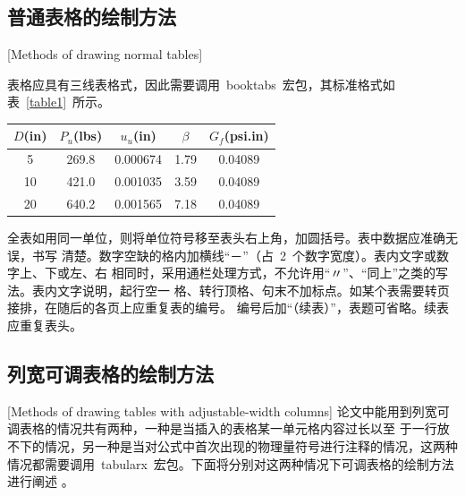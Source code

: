 \subsection{普通表格的绘制方法}[Methods of drawing normal tables]

表格应具有三线表格式，因此需要调用~booktabs~宏包，其标准格式如表~\ref{table1}~所示。
\begin{table}[htbp]
  \vspace{0.5em}\centering\wuhao
  \begin{tabular}{ccccc}
    \toprule[1.5pt]
    $D$(in) & $P_u$(lbs) & $u_u$(in) & $\beta$ & $G_f$(psi.in) \\
    \midrule[1pt]
    5       & 269.8      & 0.000674  & 1.79    & 0.04089       \\
    10      & 421.0      & 0.001035  & 3.59    & 0.04089       \\
    20      & 640.2      & 0.001565  & 7.18    & 0.04089       \\
    \bottomrule[1.5pt]
  \end{tabular}
\end{table}
全表如用同一单位，则将单位符号移至表头右上角，加圆括号。表中数据应准确无误，书写
清楚。数字空缺的格内加横线“－”（占~2~个数字宽度）。表内文字或数字上、下或左、右
相同时，采用通栏处理方式，不允许用“〃”、“同上”之类的写法。表内文字说明，起行空一
格、转行顶格、句末不加标点。如某个表需要转页接排，在随后的各页上应重复表的编号。
编号后加“（续表）”，表题可省略。续表应重复表头。

\subsection{列宽可调表格的绘制方法}[Methods of drawing tables with adjustable-width columns]
论文中能用到列宽可调表格的情况共有两种，一种是当插入的表格某一单元格内容过长以至
于一行放不下的情况，另一种是当对公式中首次出现的物理量符号进行注释的情况，这两种
情况都需要调用~tabularx~宏包。下面将分别对这两种情况下可调表格的绘制方法进行阐述
。
